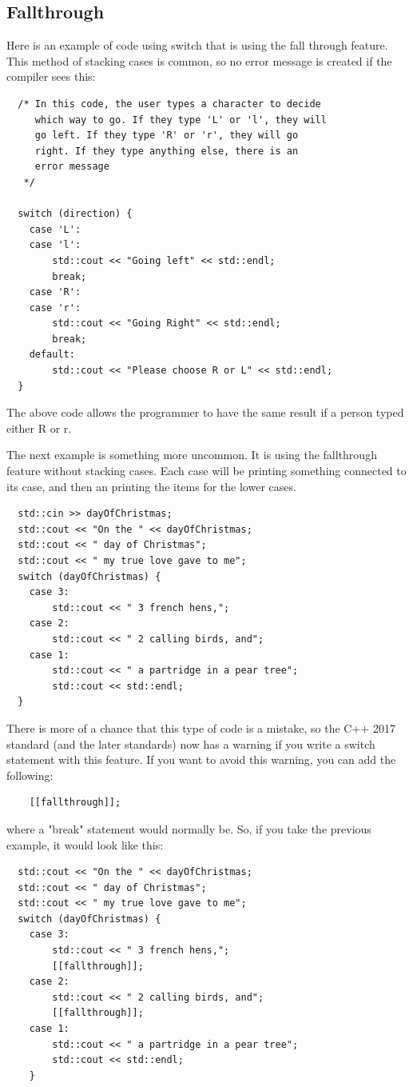 
\subsection{Fallthrough}
Here is an example of code using switch that is using the fall through feature. This method of stacking cases is common, so no error message is created if the compiler sees this:
\begin{lstlisting}
  /* In this code, the user types a character to decide 
     which way to go. If they type 'L' or 'l', they will 
     go left. If they type 'R' or 'r', they will go 
     right. If they type anything else, there is an 
     error message
   */
   
  switch (direction) {
    case 'L':
    case 'l':
        std::cout << "Going left" << std::endl;
        break;
    case 'R':
    case 'r':
        std::cout << "Going Right" << std::endl;
        break;    
    default:
        std::cout << "Please choose R or L" << std::endl;
  }
\end{lstlisting}
The above code allows the programmer to have the same result if 
a person typed either R or r. 

The next example is something more uncommon. It is using the fallthrough feature without stacking cases. Each case will be
printing something connected to its case, and then an printing the items for the lower cases.

\begin{lstlisting}
  std::cin >> dayOfChristmas;
  std::cout << "On the " << dayOfChristmas;
  std::cout << " day of Christmas";
  std::cout << " my true love gave to me";
  switch (dayOfChristmas) {
    case 3:
        std::cout << " 3 french hens,";
    case 2:
        std::cout << " 2 calling birds, and";
    case 1:
        std::cout << " a partridge in a pear tree";
        std::cout << std::endl;
  }
\end{lstlisting}

There is more of a chance that this type of code is a mistake, so the C++ 2017 standard (and the later standards) now has a warning if you write a switch statement with this feature. If you want to avoid this warning, you can add the following:
\begin{verbatim}
    [[fallthrough]];    
\end{verbatim}
where a "break" statement would normally be. So, if you take the previous example, it would look like this:
\begin{lstlisting}
  std::cout << "On the " << dayOfChristmas;
  std::cout << " day of Christmas";
  std::cout << " my true love gave to me";
  switch (dayOfChristmas) {
    case 3:
        std::cout << " 3 french hens,";
        [[fallthrough]];
    case 2:
        std::cout << " 2 calling birds, and";
        [[fallthrough]];
    case 1:
        std::cout << " a partridge in a pear tree";
        std::cout << std::endl;
    }
\end{lstlisting}

